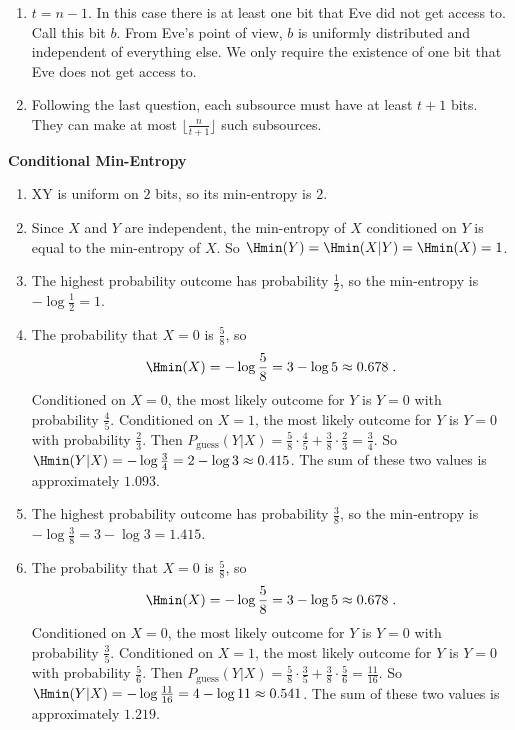 \begin{exercises}
\begin{enumerate}
\item $t=n-1$. In this case there is at least one bit that Eve did not get access to. Call this bit $b$. From Eve's point of view, $b$ is uniformly distributed and independent of everything else. We only require the existence of one bit that Eve does not get access to.

\item Following the last question, each subsource must have at least $t+1$ bits. They can make at most $\lfloor \frac{n}{t+1}\rfloor$ such subsources.
\end{enumerate}


\item {\bf Conditional Min-Entropy}

\begin{enumerate}
\item XY is uniform on $2$ bits, so its min-entropy is $2$.

\item Since $X$ and $Y$ are independent, the min-entropy of $X$ conditioned on $Y$ is equal to the min-entropy of $X$. So $\Hmin(Y) = \Hmin(X| Y) = \Hmin (X) = 1$.

\item The highest probability outcome has probability $\frac12$, so the min-entropy is $-\log\frac12 = 1$.

\item The probability that $X =0$ is $\frac58$, so 
\[\Hmin(X) = -\log\frac58 = 3-\log 5 \approx 0.678\;.\]
Conditioned on $X = 0$, the most likely outcome for $Y$ is $Y = 0$ with probability $\frac45$. Conditioned on $X = 1$, the most likely outcome for $Y$ is $Y = 0$ with probability $\frac23$.
Then $P_\text{guess}(Y| X) = \frac58\cdot \frac45 + \frac38 \cdot \frac23 = \frac34$. So $\Hmin(Y| X) = -\log \frac34 = 2 - \log 3 \approx 0.415$.
The sum of these two values is approximately $1.093$.

\item The highest probability outcome has probability $\frac38$, so the min-entropy is $-\log\frac38 = 3 - \log 3 = 1.415$.

\item The probability that $X =0$ is $\frac58$, so 
\[\Hmin(X) = -\log\frac58 = 3-\log 5 \approx 0.678\;.\]
Conditioned on $X = 0$, the most likely outcome for $Y$ is $Y = 0$ with probability $\frac35$. Conditioned on $X = 1$, the most likely outcome for $Y$ is $Y = 0$ with probability $\frac56$.
Then $P_\text{guess}(Y| X) = \frac58\cdot \frac35 + \frac38 \cdot \frac56 = \frac{11}{16}$. So $\Hmin(Y| X) = -\log \frac{11}{16} = 4 - \log 11 \approx 0.541$.
The sum of these two values is approximately $1.219$.
\end{enumerate}
\end{exercises}